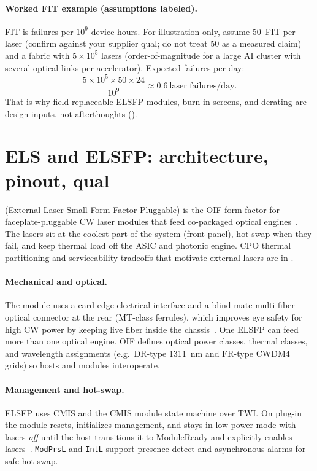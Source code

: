 \paragraph{Worked FIT example (assumptions labeled).}
\label{sec:fit-example}
FIT is failures per $10^9$ device-hours. For illustration only, assume 50~FIT per
laser (confirm against your supplier qual; do not treat 50 as a measured claim)
and a fabric with $5\times10^5$ lasers (order-of-magnitude for a large AI cluster
with several optical links per accelerator). Expected failures per day:
\[
\frac{5\times10^5 \times 50 \times 24}{10^9}
\approx 0.6\ \text{laser failures/day}.
\]
That is why field-replaceable ELSFP modules, burn-in screens, and derating are
design inputs, not afterthoughts ().

\section{ELS and ELSFP: architecture, pinout, qual}
\label{sec:elsfp}

 (External Laser Small Form-Factor Pluggable) is the
OIF form factor for faceplate-pluggable CW laser modules that feed co-packaged
optical engines~. The lasers sit at the coolest part of the
system (front panel), hot-swap when they fail, and keep thermal load off the ASIC
and photonic engine. CPO thermal partitioning and serviceability tradeoffs that
motivate external lasers are in .

\paragraph{Mechanical and optical.}
The module uses a card-edge electrical interface and a blind-mate multi-fiber
optical connector at the rear (MT-class ferrules), which improves eye safety for
high CW power by keeping live fiber inside the chassis~. One ELSFP
can feed more than one optical engine. OIF defines optical power classes, thermal
classes, and wavelength assignments (e.g.\ DR-type 1311~nm and FR-type CWDM4
grids) so hosts and modules interoperate.

\paragraph{Management and hot-swap.}
ELSFP uses CMIS and the CMIS module state machine over TWI. On plug-in the module
resets, initializes management, and stays in low-power mode with lasers
\emph{off} until the host transitions it to ModuleReady and explicitly enables
lasers~. \texttt{ModPrsL} and \texttt{IntL} support presence detect
and asynchronous alarms for safe hot-swap.

